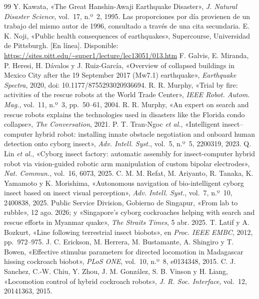 \begin{thebibliography}{99}
\footnotesize
{} Y. Kawata, «The Great Hanshin-Awaji Earthquake Disaster», \textit{J. Natural Disaster Science}, vol.~17, n.º~2, 1995. Las proporciones por día provienen de un trabajo del mismo autor de 1996, consultado a través de una cita secundaria.
 E. K. Noji, «Public health consequences of earthquakes», Supercourse, Universidad de Pittsburgh. [En línea]. Disponible: \url{https://sites.pitt.edu/~super1/lecture/lec13051/013.htm}
 F. Galvis, E. Miranda, P. Heresi, H. Dávalos y J. Ruiz-García, «Overview of collapsed buildings in Mexico City after the 19 September 2017 (Mw7.1) earthquake», \textit{Earthquake Spectra}, 2020, doi: 10.1177/8755293020936694.
 R. R. Murphy, «Trial by fire: activities of the rescue robots at the World Trade Center», \textit{IEEE Robot. Autom. Mag.}, vol.~11, n.º~3, pp.~50--61, 2004.
 R. R. Murphy, «An expert on search and rescue robots explains the technologies used in disasters like the Florida condo collapse», \textit{The Conversation}, 2021.
 P. T. Tran-Ngoc \textit{et al.}, «Intelligent insect--computer hybrid robot: installing innate obstacle negotiation and onboard human detection onto cyborg insect», \textit{Adv. Intell. Syst.}, vol.~5, n.º~5, 2200319, 2023.
 Q. Lin \textit{et al.}, «Cyborg insect factory: automatic assembly for insect-computer hybrid robot via vision-guided robotic arm manipulation of custom bipolar electrodes», \textit{Nat. Commun.}, vol.~16, 6073, 2025.
 C. M. M. Refat, M. Ariyanto, R. Tanaka, K. Yamamoto y K. Morishima, «Autonomous navigation of bio-intelligent cyborg insect based on insect visual perception», \textit{Adv. Intell. Syst.}, vol.~7, n.º~10, 2400838, 2025.
 Public Service Division, Gobierno de Singapur, «From lab to rubble», 12 ago. 2026; y «Singapore's cyborg cockroaches helping with search and rescue efforts in Myanmar quake», \textit{The Straits Times}, 5 abr. 2025.
 T. Latif y A. Bozkurt, «Line following terrestrial insect biobots», en \textit{Proc. IEEE EMBC}, 2012, pp.~972--975.
 J. C. Erickson, M. Herrera, M. Bustamante, A. Shingiro y T. Bowen, «Effective stimulus parameters for directed locomotion in Madagascar hissing cockroach biobot», \textit{PLoS ONE}, vol.~10, n.º~8, e0134348, 2015.
 C. J. Sanchez, C.-W. Chiu, Y. Zhou, J. M. González, S. B. Vinson y H. Liang, «Locomotion control of hybrid cockroach robots», \textit{J. R. Soc. Interface}, vol.~12, 20141363, 2015.

\end{thebibliography}
